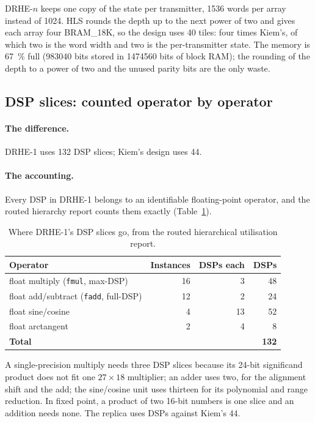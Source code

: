DRHE-$n$ keeps one copy of the state per transmitter, \num{1536} words per
array instead of \num{1024}. HLS rounds the depth up to the next power of two
and gives each array four BRAM\_18K, so the design uses 40 tiles: four times
Kiem's, of which two is the word width and two is the per-transmitter state.
The memory is \SI{67}{\percent} full (\num{983040} bits stored in
\num{1474560} bits of block RAM); the rounding of the depth to a power of two
and the unused parity bits are the only waste.

\subsection{DSP slices: counted operator by operator}
\label{sec:acc_dsp}

\paragraph{The difference.} DRHE-1 uses 132 DSP slices; Kiem's design uses 44.

\paragraph{The accounting.} Every DSP in DRHE-1 belongs to an identifiable
floating-point operator, and the routed hierarchy report counts them exactly
(Table~\ref{tab:dspcount}).

\begin{table}[htbp]
\centering
\caption[Where DRHE-1's DSP slices go]{Where DRHE-1's DSP slices go, from the
routed hierarchical utilisation report.}
\label{tab:dspcount}
\small
\begin{tabular}{@{}lrrr@{}}
\toprule
Operator & Instances & DSPs each & DSPs\\
\midrule
float multiply (\texttt{fmul}, max-DSP) & 16 & 3  & 48\\
float add/subtract (\texttt{fadd}, full-DSP) & 12 & 2 & 24\\
float sine/cosine & 4 & 13 & 52\\
float arctangent  & 2 & 4  & 8\\
\midrule
\textbf{Total} & & & \textbf{132}\\
\bottomrule
\end{tabular}
\end{table}

\noindent
A single-precision multiply needs three DSP slices because its 24-bit
significand product does not fit one $27 \times 18$ multiplier; an adder uses
two, for the alignment shift and the add; the sine/cosine unit uses thirteen for
its polynomial and range reduction. In fixed point, a product of two 16-bit
numbers is one slice and an addition needs none. The replica uses
 DSPs against Kiem's 44.

